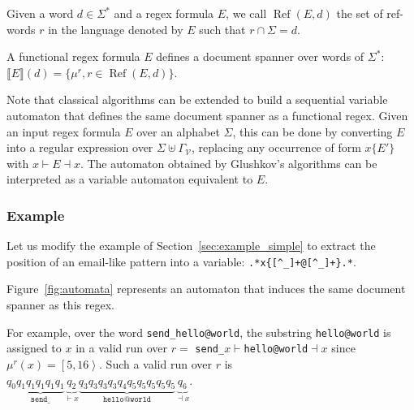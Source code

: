 \documentclass[12px]{article}
\DeclareMathOperator{\Ref}{Ref}
\newcommand{\Span}[1]{\left[ #1 \right\rangle}
\begin{document}
        Given a word $d \in \Sigma^*$ and a regex formula $E$, we call $\Ref(E,
        d)$ the set of ref-words $r$ in the language denoted by $E$ such that
        $r \cap \Sigma = d$.

        A functional regex formula $E$ defines a document spanner over words of
        $\Sigma^*$: $\llbracket E \rrbracket (d) = \{\mu^r, r \in \Ref(E,
        d)\}$.

        Note that classical algorithms can be extended to build a sequential
        variable automaton that defines the same document spanner as a
        functional regex. Given an input regex formula $E$ over an alphabet
        $\Sigma$, this can be done by converting $E$ into a regular expression
        over $\Sigma \uplus \Gamma_\mathcal{V}$, replacing any occurrence of
        form $x\{E'\}$ with $x{\vdash} E {\dashv}x$. The automaton obtained by
        Glushkov's algorithms can be interpreted as a variable automaton
        equivalent to $E$.

      \subsubsection{Example}

        Let us modify the example of Section~\ref{sec:example_simple} to extract
        the position of an email-like pattern into a variable:
        \texttt{.*x\{[\textasciicircum\_]+@[\textasciicircum\_]+\}.*}.

        Figure~\ref{fig:automata} represents an automaton that induces the same
        document spanner as this regex.

        For example, over the word \texttt{send\_hello@world}, the substring
        \texttt{hello@world} is assigned to $x$ in a valid run over $r =$
        \texttt{send\_$x{\vdash}$hello@world${\dashv}x$} since $\mu^r(x) =
        \Span{5, 16}$. Such a valid run over $r$ is $q_0 \underbrace{q_1 q_1 q_1
        q_1 q_1}_\texttt{send\_} \underbrace{q_2}_{{\vdash}x} \underbrace{q_3 q_3
        q_3 q_3 q_4 q_5 q_5 q_5 q_5 q_5}_\texttt{hello@world}
        \underbrace{q_6}_{{\dashv}x}$.
\end{document}
